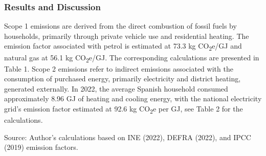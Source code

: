 \documentclass[12pt,a4paper]{article}%
\begin{document}
\subsubsection{Results and Discussion}
Scope 1 emissions are derived from the direct combustion of fossil fuels by households, primarily through private vehicle use and residential heating. The emission factor associated with petrol is estimated at 73.3 kg CO\textsubscript{2}e/GJ and natural gas at 56.1 kg CO\textsubscript{2}e/GJ. The corresponding calculations are presented in Table 1. Scope 2 emissions refer to indirect emissions associated with the consumption of purchased energy, primarily electricity and district heating, generated externally. In 2022, the average Spanish household consumed approximately 8.96 GJ of heating and cooling energy, with the national electricity grid's emission factor estimated at 92.6 kg CO\textsubscript{2}e per GJ, see Table 2 for the calculations.

\begin{table}[h]
\centering
\captionsetup{justification=raggedright,singlelinecheck=false} 
\caption{\small Direct Emissions from Household Energy and Transport (Scope 1)}\label{tab:scope1}
\raggedright

\vspace{0.3cm}
\footnotesize{Source: Author's calculations based on INE (2022), DEFRA (2022), and IPCC (2019) emission factors.}
\end{table}
\end{document}
